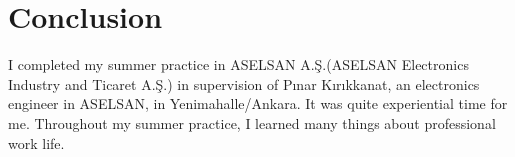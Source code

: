 \- \vfill

								
	
 
%      
	
	











\section{Conclusion}
\-\indent 
	I completed my summer practice in ASELSAN A.Ş.(ASELSAN Electronics Industry and Ticaret A.Ş.) in supervision of Pınar Kırıkkanat, an electronics engineer in ASELSAN, in Yenimahalle/Ankara. It was quite experiential time for me. Throughout my summer practice, I learned many things about professional work life. 

